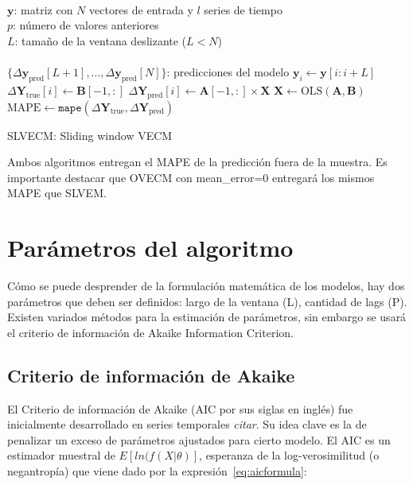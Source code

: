 \begin{algorithm}[ht]
\begin{algorithmic}[1]
\REQUIRE $\,$ \\
$\mathbf{y}$: matriz con $N$ vectores de entrada y $l$ series de tiempo\\
$p$: número de valores anteriores\\
$L$: tamaño de la ventana deslizante ($L<N$) \\
\ENSURE  $\,$ \\
$\{\Delta \mathbf{y}_{\text{pred}}[L+1],\dots,\Delta \mathbf{y}_{\text{pred}}[N]\}$: predicciones del modelo
    \STATE $\mathbf{y}_i \gets \mathbf{y}[i:i+L]$
        \STATE $\Delta \mathbf{Y}_{\text{true}}[i] \gets \mathbf{B}[-1,:]$
        \STATE $\Delta \mathbf{Y}_{\text{pred}}[i] \gets \mathbf{A}[-1,:] \times \mathbf{X}$
    \ENDIF
    \STATE $\mathbf{X} \gets \text{OLS} (\mathbf{A},\mathbf{B})$
\ENDFOR
    \STATE $\text{MAPE} \gets \texttt{mape}(\Delta \mathbf{Y}_{\text{true}}, \Delta
    \mathbf{Y}_{\text{pred}})$
\end{algorithmic}
\caption{SLVECM: Sliding window VECM}
\label{alg:SLVECM}
\end{algorithm}

Ambos algoritmos entregan el MAPE de la predicción fuera de la muestra. Es
importante destacar que OVECM con mean\_error=0 entregará los mismos MAPE que
SLVEM.

\section{Parámetros del algoritmo}
Cómo se puede desprender de la formulación matemática de los modelos, hay dos
parámetros que deben ser definidos: largo de la ventana (L), cantidad de lags
(P). Existen variados métodos para la estimación de parámetros, sin embargo se
usará el criterio de información de Akaike Information Criterion.

\subsection{Criterio de información de Akaike}
El Criterio de información de Akaike (AIC por sus siglas en inglés) fue
inicialmente desarrollado en series temporales \emph{citar}. Su idea clave es
la de penalizar un exceso de parámetros ajustados para cierto modelo. El AIC es
un estimador muestral de $E[ln(f(X|\theta)]$, esperanza de la log-verosimilitud
(o negantropía) que viene dado por la expresión~\ref{eq:aicformula}:

